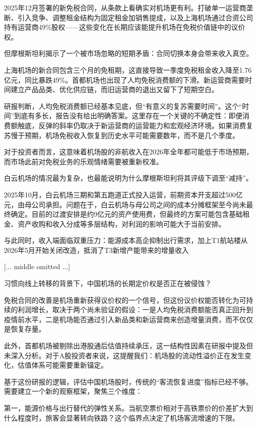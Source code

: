 \documentclass[11pt]{ctexart}
\begin{document}
2025年12月签署的新免税合同，从条款上看确实对机场更有利。打破单一运营商垄断、引入竞争、调整租金结构为固定租金加销售提成，以及上海机场通过合资公司持有运营商49\%股权——这些变化在长期应该能提升机场在免税价值链中的议价权。

但摩根斯坦利揭示了一个被市场忽略的短期矛盾：合同切换本身会带来收入真空。

上海机场的新合同包含三个月的免租期，这直接导致一季度免税租金收入降至1.76亿元，同比暴跌49\%。首都机场也出现了人均免税消费额的下滑。新运营商需要时间建立产品品类、优化供应链，而旧运营商的退出又留下了短期空白。

研报判断，人均免税消费额已经基本见底，但“有意义的复苏需要时间”。这个“时间”到底有多长，报告没有给出明确答案。这里存在一个关键的不确定性：即便消费额触底，反弹的斜率仍取决于新运营商的运营能力和宏观经济环境。如果消费复苏慢于预期，机场免税收入恢复到历史水平可能需要数年，而不是几个季度。

对于投资者而言，这意味着机场股的非航收入在2026年全年都可能低于市场预期，而市场此前对免税业务的乐观情绪需要被重新校准。

白云机场的情况最为复杂，也最能说明为什么摩根斯坦利将其评级下调至“减持”。

2025年10月，白云机场三期和第五跑道正式投入运营，前期资本开支超过500亿元，由母公司承担。问题在于，白云机场与母公司之间的成本分摊框架至今尚未最终确定。目前的过渡安排是约9亿元的资产使用费，但最终的方案可能包含基础租金、资产收购和收入分成等多层结构，对利润的影响可能大于当前安排。

与此同时，收入端面临双重压力：能源成本高企抑制出行需求，加上T1航站楼从2026年5月开始关闭改造，抵消了T3新增产能带来的增量收入

[... middle omitted ...]

习惯向线上转移的背景下，中国机场的长期定价权是否正在被侵蚀？

免税合同的改善是机场重新获得议价权的一个信号，但这份议价权能否转化为可持续的利润增长，取决于两个尚未验证的假设：一是人均免税消费额能否真正回升到疫情前水平，二是机场能否通过引入新品类和新运营商来创造增量消费，而不仅仅是恢复存量。

此外，首都机场被剔除出港股通后估值持续承压，这一结构性因素在研报中提及但未深入分析。对于A股投资者来说，这提醒我们：机场股的流动性溢价正在发生变化，估值体系可能需要重新锚定。

基于这份研报的逻辑，评估中国机场股时，传统的“客流恢复进度”指标已经不够。需要建立一个新的观察框架，聚焦三个维度：

第一，能源价格与出行替代的弹性关系。当航空票价相对于高铁票价的价差扩大到什么程度时，旅客会显著转向铁路？这个临界点决定了机场客流增速的下限。
\end{document}
